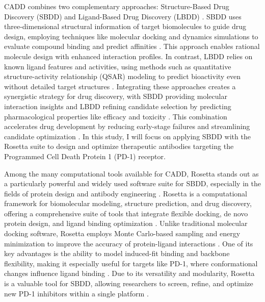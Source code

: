 \documentclass[11pt]{article}
\begin{document}
CADD combines two complementary approaches: Structure-Based Drug Discovery (SBDD) and Ligand-Based Drug Discovery (LBDD) \cite{Kuhn2016}. SBDD uses three-dimensional structural information of target biomolecules to guide drug design, employing techniques like molecular docking and dynamics simulations to evaluate compound binding and predict affinities \cite{Kitchen2004}. This approach enables rational molecule design with enhanced interaction profiles. In contrast, LBDD relies on known ligand features and activities, using methods such as quantitative structure-activity relationship (QSAR) modeling to predict bioactivity even without detailed target structures \cite{Kuhn2016}. Integrating these approaches creates a synergistic strategy for drug discovery, with SBDD providing molecular interaction insights and LBDD refining candidate selection by predicting pharmacological properties like efficacy and toxicity \cite{Moult2019}. This combination accelerates drug development by reducing early-stage failures and streamlining candidate optimization \cite{DiMasi2003,Paul2010}. In this study, I will focus on applying SBDD with the Rosetta suite to design and optimize therapeutic antibodies targeting the Programmed Cell Death Protein 1 (PD-1) receptor.

Among the many computational tools available for CADD, Rosetta stands out as a particularly powerful and widely used software suite for SBDD, especially in the fields of protein design and antibody engineering \cite{Leaver-Fay2011}. Rosetta is a computational framework for biomolecular modeling, structure prediction, and drug discovery, offering a comprehensive suite of tools that integrate flexible docking, de novo protein design, and ligand binding optimization \cite{leman2020}. Unlike traditional molecular docking software, Rosetta employs Monte Carlo-based sampling and energy minimization to improve the accuracy of protein-ligand interactions \cite{Alford2017, meiler2006}. One of its key advantages is the ability to model induced-fit binding and backbone flexibility, making it especially useful for targets like PD-1, where conformational changes influence ligand binding \cite{park2019}. Due to its versatility and modularity, Rosetta is a valuable tool for SBDD, allowing researchers to screen, refine, and optimize new PD-1 inhibitors within a single platform \cite{leaver2013, baek2021}.
\end{document}
